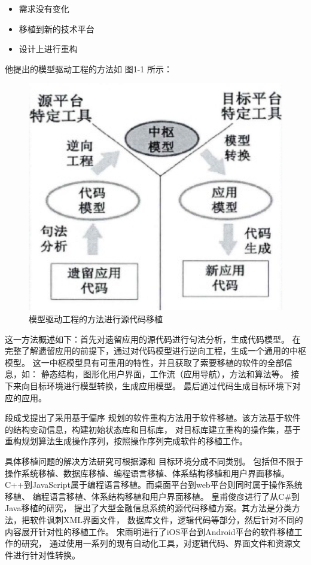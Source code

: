\begin{itemize}
    \item 需求没有变化
    \item 移植到新的技术平台
    \item 设计上进行重构
\end{itemize}

他提出的模型驱动工程的方法如 图1-1 所示：

\begin{figure}[h!] %
    \centering
    \includegraphics[width=200bp]{figure/pic/model-driving-software-porting.png}
    \caption{模型驱动工程的方法进行源代码移植}
    \label{model-driving-software-porting-sample}
\end{figure}

这一方法概述如下：首先对遗留应用的源代码进行句法分析，生成代码模型。
在完整了解遗留应用的前提下，通过对代码模型进行逆向工程，生成一个通用的中枢模型。
这一中枢模型具有可重用的特性，并且获取了索要移植的软件的全部信息，如：
静态结构，图形化用户界面，工作流（应用导航），方法和算法等。
接下来向目标环境进行模型转换，生成应用模型。
最后通过代码生成目标环境下对应的应用。

段成戈提出了采用基于偏序
规划的软件重构方法用于软件移植。该方法基于软件的结构变动信息，构建初始状态库和目标库，
对目标库建立重构的操作集，基于重构规划算法生成操作序列，按照操作序列完成软件的移植工作。

具体移植问题的解决方法研究可根据源和
目标环境分成不同类别。
包括但不限于操作系统移植、数据库移植、编程语言移植、体系结构移植和用户界面移植。
C++到JavaScript属于编程语言移植。而桌面平台到web平台则同时属于操作系统移植、
编程语言移植、体系结构移植和用户界面移植。
皇甫俊彦进行了从C\#到Java移植的研究，
提出了大型金融信息系统的源代码移植方案。其方法是分类方法，把软件讽刺XML界面文件，
数据库文件，逻辑代码等部分，然后针对不同的内容展开针对性的移植工作。
宋雨明进行了iOS平台到Android平台的软件移植工作的研究，
通过使用一系列的现有自动化工具，对逻辑代码、界面文件和资源文件进行针对性转换。

